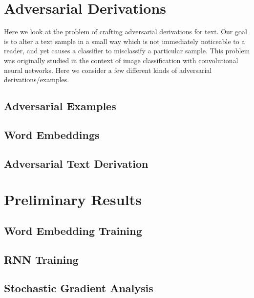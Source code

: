 \chapter{Adversarial Derivations}
Here we look at the problem of crafting adversarial derivations for text.  Our goal is to alter a text sample in a small way which is not immediately noticeable to a reader, and yet causes a classifier to misclassify a particular sample.  This problem was originally studied in the context of image classification with convolutional neural networks.  Here we consider a few different kinds of adversarial derivations/examples.

\section{Adversarial Examples} 

\section{Word Embeddings}\label{sec:word_embeddings}

\section{Adversarial Text Derivation}


\chapter{Preliminary Results}
\section{Word Embedding Training}

\section{RNN Training}

\section{Stochastic Gradient Analysis}\label{sec:stochastic_gradient_analysis}

